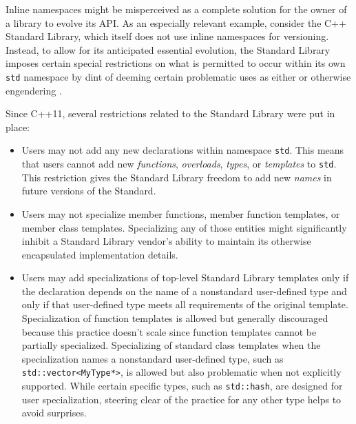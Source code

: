 
Inline namespaces might be misperceived as a complete solution for the owner of a library to evolve its API. As an especially relevant example, consider the C++ Standard Library, which itself does not use inline namespaces for versioning. Instead, to allow for its anticipated essential evolution, the Standard Library imposes certain special restrictions on what is permitted to occur within its own \lstinline!std! namespace by dint of deeming certain problematic uses as either  or otherwise engendering .

Since C++11, several restrictions related to the Standard Library were
put in place:
\begin{itemize}
\item{Users may not add any new declarations within namespace \lstinline!std!. This means that users cannot add new \emph{functions}, \emph{overloads}, \emph{types}, or \emph{templates} to \lstinline!std!. This restriction gives the Standard Library freedom to add new \emph{names} in future versions of the Standard.}
\item{Users may not specialize member functions, member function templates, or member class templates. Specializing any of those entities might significantly inhibit a Standard Library vendor’s ability to maintain its otherwise encapsulated implementation details.}
\item{Users may add specializations of top-level Standard Library templates only if the declaration depends on the name of a nonstandard user-defined type and only if that user-defined type meets all requirements of the original template. Specialization of function templates is allowed but generally discouraged because this practice doesn’t scale since function templates cannot be partially specialized. Specializing of standard class templates when the specialization names a nonstandard user-defined type, such as \lstinline!std::vector<MyType*>!, is allowed but also problematic when not explicitly supported. While certain specific types, such as \lstinline!std::hash!, are designed for user specialization, steering clear of the practice for any other type helps to avoid surprises.}
\end{itemize}


